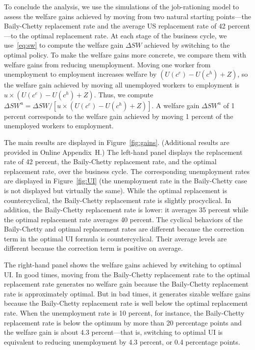\documentclass[letterpaper,12pt,leqno]{article}
\newcommand{\pre}[1]{\left( #1 \right)}
\newcommand{\brk}[1]{\left[ #1 \right]}
\def \D{{\Delta}}
\begin{document}
To conclude the analysis, we use the simulations of the job-rationing model to assess the welfare gains achieved by moving from two natural starting points---the Baily-Chetty replacement rate and the average US replacement rate of 42 percent---to the optimal replacement rate. At each stage of the business cycle, we use~\eqref{eq:sw} to compute the welfare gain $\D SW$ achieved by switching to the optimal policy. To make the welfare gains more concrete, we compare them with welfare gains from reducing unemployment. Moving one worker from unemployment to employment increases welfare by $\pre{U(c^{e})-U(c^{h})+Z}$, so the welfare gain achieved by moving all unemployed workers to employment is $u\times\pre{U(c^{e})-U(c^{h})+Z}$. Thus, we compute $\D SW^u = \D SW/\brk{u\times\pre{U(c^{e})-U(c^{h})+Z}}$. A welfare gain $\D SW^{u}$ of 1 percent corresponds to the welfare gain achieved by moving 1 percent of the unemployed workers to employment.

The main results are displayed in Figure~\ref{fig:gains}. (Additional results are provided in Online Appendix~H.) The left-hand panel displays the replacement rate of 42 percent, the Baily-Chetty replacement rate, and the optimal replacement rate, over the business cycle. The corresponding unemployment rates  are displayed in Figure~\ref{fig:UI} (the unemployment rate in the Baily-Chetty case is not displayed but virtually the same). While the optimal replacement is  countercyclical, the Baily-Chetty replacement rate is slightly procyclical. In addition, the Baily-Chetty replacement rate is lower: it averages 35 percent while the optimal replacement rate averages 40 percent. The cyclical behaviors of the Baily-Chetty and optimal replacement rates are different because the correction term in the optimal UI formula is countercyclical. Their average levels are different because the correction term is positive on average.

The right-hand panel shows the welfare gains achieved by switching to optimal UI. In good times, moving from the Baily-Chetty replacement rate to the optimal replacement rate generates no welfare gain because the Baily-Chetty replacement rate is approximately optimal. But in bad times, it generates sizable welfare gains because the Baily-Chetty replacement rate is well below the optimal replacement rate. When the unemployment rate is 10 percent, for instance, the Baily-Chetty replacement rate is below the optimum by more than 20 percentage points and the welfare gain is about 4.3 percent---that is, switching to optimal UI is equivalent to reducing unemployment by 4.3 percent, or 0.4 percentage points.
\end{document}
